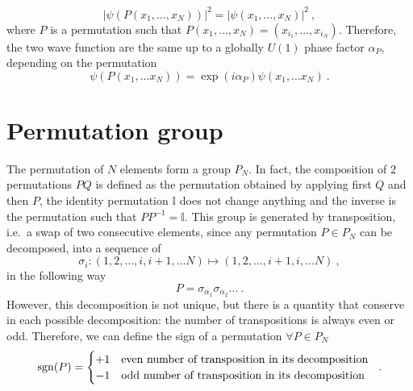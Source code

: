     \begin{equation*}
        |\psi(P(x_1, \ldots, x_N))|^2 = |\psi(x_1, \ldots, x_N)|^2 ~,
    \end{equation*}
    where $P$ is a permutation such that $P(x_1, \ldots, x_N) = (x_{i_1}, \ldots, x_{i_N})$. Therefore, the two wave function are the same up to a globally $U(1)$ phase factor $\alpha_P$, depending on the permutation
    \begin{equation}\label{perm:phase}
        \psi(P(x_1, \ldots x_N)) = \exp(i \alpha_P) \psi (x_1, \ldots x_N) ~.
    \end{equation}

\section{Permutation group}

    The permutation of $N$ elements form a group $P_N$. In fact, the composition of $2$ permutations $PQ$ is defined as the permutation obtained by applying first $Q$ and then $P$, the identity permutation $\mathbb I$ does not change anything and the inverse is the permutation such that $P P^{-1} = \mathbb I$. This group is generated by transposition, i.e.~a swap of two consecutive elements, since any permutation $P \in P_N$ can be decomposed, into a sequence of 
    \begin{equation*}
        \sigma_i \colon (1,2,\ldots, i, i+1, \ldots N) \mapsto (1,2,\ldots, i+1, i, \ldots N) ~,
    \end{equation*}
    in the following way 
    \begin{equation}\label{perm:dec}
        P = \sigma_{\alpha_1} \sigma_{\alpha_2} \ldots ~.
    \end{equation}
    However, this decomposition is not unique, but there is a quantity that conserve in each possible decomposition: the number of transpositions is always even or odd. Therefore, we can define the sign of a permutation $\forall P \in P_N$
    \begin{equation*}
        \operatorname{sgn}(P) = \begin{cases}
            + 1 & \textnormal{even number of transposition in its decomposition } \\
            - 1 & \textnormal{odd number of transposition in its decomposition } \\
        \end{cases} ~.
    \end{equation*}


